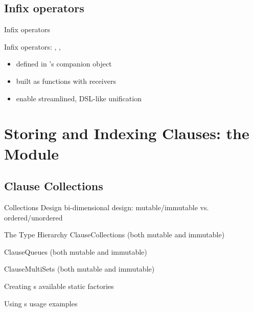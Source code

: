 \documentclass[handout]{beamer}
\begin{document}
\subsection{Infix operators}

\begin{frame}{Infix operators}
    \begin{block}{Infix operators: , , }
        \begin{itemize}
            \item defined in 's companion object
            \item built as functions with receivers
            \item enable streamlined, DSL-like unification
        \end{itemize}
    \end{block}
\end{frame}

\section{Storing and Indexing Clauses: the  Module}

\subsection{Clause Collections}

\begin{frame}[allowframebreaks]{Collections Design}
    bi-dimensional design: mutable/immutable vs. ordered/unordered
\end{frame}

\begin{frame}[allowframebreaks]{The  Type Hierarchy}
    ClauseCollections (both mutable and immutable)

    ClauseQueues (both mutable and immutable)

    ClauseMultiSets (both mutable and immutable)
\end{frame}

\begin{frame}[allowframebreaks]{Creating s}
    available static factories
\end{frame}

\begin{frame}[allowframebreaks]{Using s}
    usage examples
\end{frame}
\end{document}
